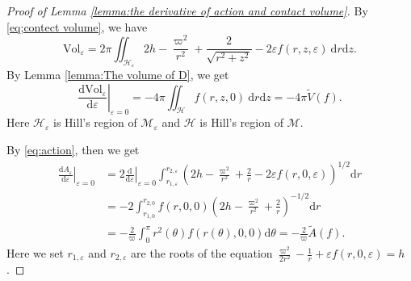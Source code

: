 \documentclass[11pt]{amsart}
\newcommand{\M}{\mathcal M}
\newcommand{\blue}[1]{\color{blue}#1\color{black}}
\newcommand{\ep}{\varepsilon}
\newcommand{\om}{\varpi}
\begin{document}
\begin{proof}[Proof of Lemma \ref{lemma:the derivative of action and contact volume}]
	By \eqref{eq;contect volume}, we have
	\begin{equation}
		\text{Vol}_{\ep}=2\pi\iint_{\mathcal{H}_{\ep}}2h-\frac{\om^{2}}{r^{2}}+\frac{2}{\sqrt{r^{2}+z^{2}}}-2\ep f(r,z,\ep)\ \mathrm{d}r\mathrm{d}z.
	\end{equation}
	By Lemma \ref{lemma:The volume of D}, we get
	\begin{equation}
		\left. \frac{\mathrm{d}\text{Vol}_{\ep}}{\mathrm{d}\ep}\right| _{\ep=0}=-4\pi\iint_{\mathcal{H}} f(r,z,0)\ \mathrm{d}r\mathrm{d}z=-4\pi\tilde{V}(f).
	\end{equation}
	Here $\mathcal{H}_\ep$ is Hill's region of $\mathcal{M}_\ep$ and $\mathcal{H}$ is Hill's region of $\mathcal{M}$.
	
	By \eqref{eq:action}, then we get
	\begin{equation}
		\begin{aligned}
			\left.\frac{\mathrm{d}A_{\ep}}{\mathrm{d}\ep}\right|_{\ep=0}&=2\left.\frac{\mathrm{d}}{\mathrm{d}\ep}\right|_{\ep=0}\int_{r_{1,\ep}}^{r_{2,\ep}}\left(2h-\frac{\om^{2}}{r^{2}}+\frac{2}{r}-2\ep f(r,0,\ep)\right)^{1/2}\mathrm{d}r\\
			&=-2\int_{r_{1,0}}^{r_{2,0}}f(r,0,0)\left(2h-\frac{\om^{2}}{r^{2}}+\frac{2}{r}\right)^{-1/2}\mathrm{d}r\\
			&=-\frac{2}{\om}\int_{0}^{\pi}r^{2}(\theta)f(r(\theta),0,0)\mathrm{d}\theta=-\frac{2}{\om}\tilde{A}(f).
		\end{aligned}
	\end{equation} 
	Here we set $r_{1,\ep}$ and $r_{2,\ep}$ are the roots of the equation $\frac{\om^{2}}{2r^{2}}-\frac{1}{r}+\ep f(r,0,\ep)=h$.
\end{proof}



\end{document}
